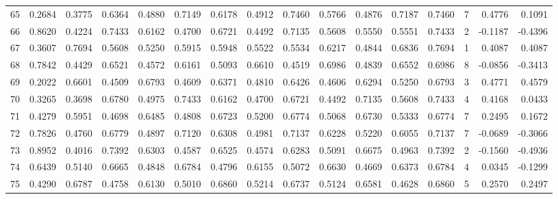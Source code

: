 \begin{tabular}{lrrrrrrrrrrrrrrr}
65  &      0.2684 &  0.3775 &  0.6364 &  0.4880 &  0.7149 &  0.6178 &  0.4912 &  0.7460 &  0.5766 &  0.4876 &   0.7187 &     0.7460 &      7 &                    0.4776 &                     0.1091 \\
66  &      0.8620 &  0.4224 &  0.7433 &  0.6162 &  0.4700 &  0.6721 &  0.4492 &  0.7135 &  0.5608 &  0.5550 &   0.5551 &     0.7433 &      2 &                   -0.1187 &                    -0.4396 \\
67  &      0.3607 &  0.7694 &  0.5608 &  0.5250 &  0.5915 &  0.5948 &  0.5522 &  0.5534 &  0.6217 &  0.4844 &   0.6836 &     0.7694 &      1 &                    0.4087 &                     0.4087 \\
68  &      0.7842 &  0.4429 &  0.6521 &  0.4572 &  0.6161 &  0.5093 &  0.6610 &  0.4519 &  0.6986 &  0.4839 &   0.6552 &     0.6986 &      8 &                   -0.0856 &                    -0.3413 \\
69  &      0.2022 &  0.6601 &  0.4509 &  0.6793 &  0.4609 &  0.6371 &  0.4810 &  0.6426 &  0.4606 &  0.6294 &   0.5250 &     0.6793 &      3 &                    0.4771 &                     0.4579 \\
70  &      0.3265 &  0.3698 &  0.6780 &  0.4975 &  0.7433 &  0.6162 &  0.4700 &  0.6721 &  0.4492 &  0.7135 &   0.5608 &     0.7433 &      4 &                    0.4168 &                     0.0433 \\
71  &      0.4279 &  0.5951 &  0.4698 &  0.6485 &  0.4808 &  0.6723 &  0.5200 &  0.6774 &  0.5068 &  0.6730 &   0.5333 &     0.6774 &      7 &                    0.2495 &                     0.1672 \\
72  &      0.7826 &  0.4760 &  0.6779 &  0.4897 &  0.7120 &  0.6308 &  0.4981 &  0.7137 &  0.6228 &  0.5220 &   0.6055 &     0.7137 &      7 &                   -0.0689 &                    -0.3066 \\
73  &      0.8952 &  0.4016 &  0.7392 &  0.6303 &  0.4587 &  0.6525 &  0.4574 &  0.6283 &  0.5091 &  0.6675 &   0.4963 &     0.7392 &      2 &                   -0.1560 &                    -0.4936 \\
74  &      0.6439 &  0.5140 &  0.6665 &  0.4848 &  0.6784 &  0.4796 &  0.6155 &  0.5072 &  0.6630 &  0.4669 &   0.6373 &     0.6784 &      4 &                    0.0345 &                    -0.1299 \\
75  &      0.4290 &  0.6787 &  0.4758 &  0.6130 &  0.5010 &  0.6860 &  0.5214 &  0.6737 &  0.5124 &  0.6581 &   0.4628 &     0.6860 &      5 &                    0.2570 &                     0.2497 \\

\end{tabular}
